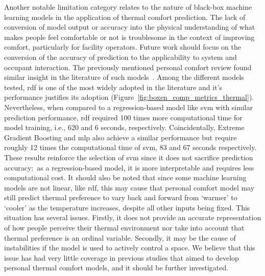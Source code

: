 Another notable limitation category relates to the nature of black-box machine learning models in the application of thermal comfort prediction. 
The lack of conversion of model output or accuracy into the physical understanding of what makes people feel comfortable or not is troublesome in the context of improving comfort, particularly for facility operators.
Future work should focus on the conversion of the accuracy of prediction to the applicability to system and occupant interaction.
The previously mentioned personal comfort review found similar insight in the literature of such models~\cite{ArakawaMartins2022}.
Among the different models tested, \gls{rdf} is one of the most widely adopted in the literature and it's performance justifies its adoption (Figure~\ref{fig:boxen_comp_metrics_thermal}).
Nevertheless, when compared to a regression-based model like \ac{svm} with similar prediction performance, \gls{rdf} required 100 times more computational time for model training, i.e., 620 and 6 seconds, respectively.
Coincidentally, Extreme Gradient Boosting and \gls{mlp} also achieve a similar performance but require roughly 12 times the computational time of \ac{svm}, 83 and 67 seconds respectively.
These results reinforce the selection of \ac{svm} since it does not sacrifice prediction accuracy;\ as a regression-based model, it is more interpretable and requires less computational cost.
It should also be noted that since some machine learning models are not linear, like \gls{rdf}, this may cause that personal comfort model may still predict thermal preference to vary back and forward from `warmer' to `cooler' as the temperature increases, despite all other inputs being fixed.
This situation has several issues. 
Firstly, it does not provide an accurate representation of how people perceive their thermal environment nor take into account that thermal preference is an ordinal variable. 
Secondly, it may be the cause of instabilities if the model is used to actively control a space.
We believe that this issue has had very little coverage in previous studies that aimed to develop personal thermal comfort models, and it should be further investigated.